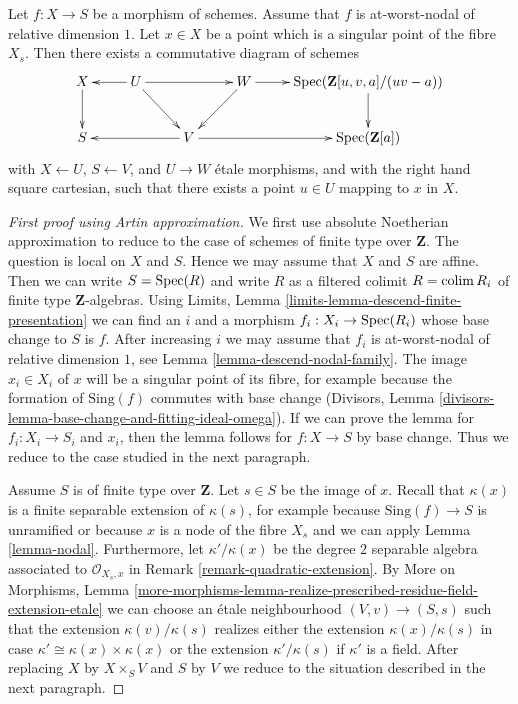 \begin{lemma}
\label{lemma-etale-local-structure-nodal-family}
Let $f : X \to S$ be a morphism of schemes. Assume that
$f$ is at-worst-nodal of relative dimension $1$. Let
$x \in X$ be a point which is a singular point of the
fibre $X_s$. Then there exists a commutative diagram of schemes
$$
\xymatrix{
X \ar[d] &
U \ar[rr] \ar[l] \ar[rd] & &
W \ar[r] \ar[ld] &
\Spec(\mathbf{Z}[u, v, a]/(uv - a)) \ar[d] \\
S & &
V \ar[ll] \ar[rr] & & \Spec(\mathbf{Z}[a])
}
$$
with $X \leftarrow U$, $S \leftarrow V$, and $U \to W$ \'etale morphisms,
and with the right hand square cartesian, such that there exists
a point $u \in U$ mapping to $x$ in $X$.
\end{lemma}

\begin{proof}[First proof using Artin approximation]
We first use absolute Noetherian approximation to reduce to the
case of schemes of finite type over $\mathbf{Z}$.
The question is local on $X$ and $S$. Hence we may assume that
$X$ and $S$ are affine. Then we can write $S = \mathop{\mathrm{Spec}}(R)$
and write $R$ as a filtered colimit $R = \mathop{\mathrm{colim}}\nolimits R_i$
of finite type $\mathbf{Z}$-algebras.
Using Limits, Lemma \ref{limits-lemma-descend-finite-presentation}
we can find an $i$ and a morphism $f_i : X_i \to \mathop{\mathrm{Spec}}(R_i)$ whose base
change to $S$ is $f$. After increasing $i$ we may assume that $f_i$
is at-worst-nodal of relative dimension $1$, see
Lemma \ref{lemma-descend-nodal-family}.
The image $x_i \in X_i$ of $x$ will be a singular
point of its fibre, for example because the formation of
$\text{Sing}(f)$ commutes with base change (Divisors, Lemma
\ref{divisors-lemma-base-change-and-fitting-ideal-omega}).
If we can prove the lemma for $f_i : X_i \to S_i$ and
$x_i$, then the lemma follows for $f : X \to S$ by base
change. Thus we reduce to the case studied in the next
paragraph.

\medskip\noindent
Assume $S$ is of finite type over $\mathbf{Z}$. Let $s \in S$ be the
image of $x$. Recall that $\kappa(x)$ is a finite separable extension
of $\kappa(s)$, for example because $\text{Sing}(f) \to S$
is unramified or because $x$ is a node of the fibre $X_s$
and we can apply Lemma \ref{lemma-nodal}.
Furthermore, let $\kappa'/\kappa(x)$ be the
degree $2$ separable algebra associated to $\mathcal{O}_{X_s, x}$ in
Remark \ref{remark-quadratic-extension}.
By More on Morphisms, Lemma
\ref{more-morphisms-lemma-realize-prescribed-residue-field-extension-etale}
we can choose an \'etale neighbourhood $(V, v) \to (S, s)$
such that the extension $\kappa(v)/\kappa(s)$ realizes either
the extension $\kappa(x)/\kappa(s)$ in case
$\kappa' \cong \kappa(x) \times \kappa(x)$ or
the extension $\kappa'/\kappa(s)$ if $\kappa'$ is a field.
After replacing $X$ by $X \times_S V$ and $S$ by $V$
we reduce to the situation described in the next paragraph.


\end{proof}

